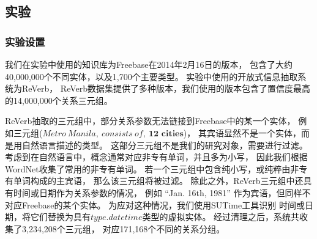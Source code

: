 



\subsection{实验}
\label{sec:tinf-exp}

\subsubsection{实验设置}
我们在实验中使用的知识库为Freebase\cite{bollacker2008freebase}在2014年2月16日的版本，
包含了大约40,000,000个不同实体，以及1,700个主要类型。
实验中使用的开放式信息抽取系统为ReVerb\cite{fader2011identifying}，
ReVerb数据集提供了多种版本，我们使用的版本包含了置信度最高的14,000,000个关系三元组。

ReVerb抽取的三元组中，部分关系参数无法链接到Freebase中的某一个实体，
例如三元组($Metro\ Manila,\ consists\ of,\ \textbf{12 cities}$)，
其宾语显然不是一个实体，而是用自然语言描述的类型。
这部分三元组不是我们的研究对象，需要进行过滤。
考虑到在自然语言中，概念通常对应非专有单词，并且多为小写，
因此我们根据WordNet收集了常用的非专有单词。
若一个三元组中包含纯小写，或纯粹由非专有单词构成的主宾语，
那么该三元组将被过滤。
除此之外，ReVerb三元组中还具有时间或日期作为关系参数的情况，
例如 ``Jan. 16th, 1981'' 作为宾语，但同样不对应Freebase的某个实体。
为应对这种情况，我们使用SUTime\cite{chang2012sutime}工具识别
时间或日期，将它们替换为具有$type.datetime$类型的虚拟实体。
经过清理之后，系统共收集了3,234,208个三元组，
对应171,168个不同的关系分组。

